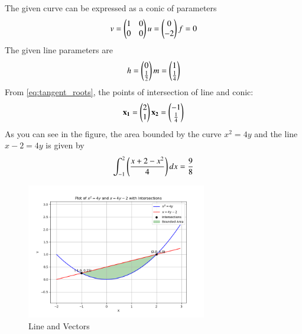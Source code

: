 \documentclass[journal]{IEEEtran}
\begin{document}
The given curve can be expressed as a conic of parameters
\begin{align}
	v=\begin{pmatrix}1&0\\0&0\end{pmatrix} u=\begin{pmatrix}0\\-2\end{pmatrix} f=0 
\end{align}
The given line parameters are
\begin{align}
	h=\begin{pmatrix}0\\ \frac{1}{2}\end{pmatrix} m=\begin{pmatrix}1\\\frac{1}{4}\end{pmatrix}
\end{align}
From \eqref{eq:tangent_roots}, the points of intersection of line and conic:
\begin{align}
	\mathbf{x_1} = \begin{pmatrix}2\\1\end{pmatrix} \mathbf{x_2} = \begin{pmatrix}-1\\\frac{1}{4}\end{pmatrix}
\end{align}
As you can see in the figure, the area bounded by the curve $x^{2} = 4y$ and the line $x - 2 = 4y $  is given by
\begin{align}
	\int_{-1}^{2} \left(\frac{x + 2 - x^{2}}{4}\right)dx = \frac{9}{8} 
\end{align}
\newpage
\begin{figure}[h!]
\begin{center}
	\includegraphics[width=0.7\textwidth]{Fig/fig.png}
	\caption{Line and Vectors}
	\label{fig:4-4.2-13 - Figure -1}
\end{center}
\end{figure}
\end{document}
